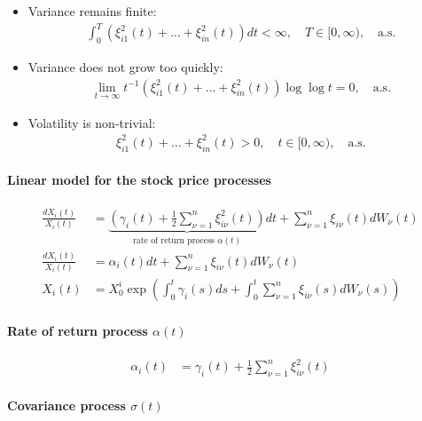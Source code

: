 \documentclass[a4paper,landscape,8pt,fleqn]{scrartcl}
\begin{document}
\begin{multicols*}{3}
\begin{itemize}
\begin{itemize}
\item Variance remains finite:
\begin{align*}
\int_0^T \left( \xi_{i1}^2(t) + \ldots + \xi_{in}^2(t) \right) dt < \infty, \quad T \in [0, \infty), \quad \text{a.s.}
\end{align*}
\item Variance does not grow too quickly:
\begin{align*}
\lim\limits_{t \rightarrow \infty} t^{-1} \left( \xi_{i1}^2(t) + \ldots + \xi_{in}^2(t) \right) \log \log t = 0, \quad \text{a.s.}
\end{align*}
\item Volatility is non-trivial:
\begin{align*}
\xi_{i1}^2(t) + \ldots + \xi_{in}^2(t) > 0, \quad t \in [0,\infty), \quad \text{a.s.}
\end{align*}
\end{itemize}
\end{itemize}

\paragraph{Linear model for the stock price processes}

\begin{align*}
\frac{dX_i(t)}{X_i(t)} &= \underbrace{\left( \gamma_i(t) + \frac{1}{2} \sum_{\nu=1}^n \xi_{i \nu}^2(t) \right)}\limits_{\text{rate of return process } \alpha(t)} dt + \sum_{\nu=1}^n \xi_{i \nu}(t) dW_\nu(t) \\
\frac{dX_i(t)}{X_i(t)} &= \alpha_i(t) dt + \sum_{\nu=1}^n \xi_{i \nu}(t) dW_\nu(t) \\
X_i(t) &= X_0^i \exp \left( \int_0^t \gamma_i(s) ds + \int_0^t \sum_{\nu=1}^n \xi_{i \nu}(s) dW_\nu(s) \right)
\end{align*}

\paragraph{Rate of return process $\alpha(t)$}

\begin{align*}
\alpha_i(t) &= \gamma_i(t) + \frac{1}{2} \sum_{\nu=1}^n \xi_{i \nu}^2(t)
\end{align*}

\paragraph{Covariance process $\sigma(t)$}


\end{multicols*}
\end{document}
